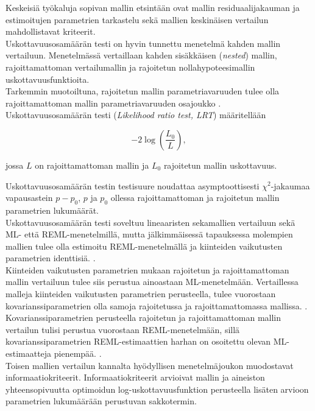 \documentclass[finnish]{docopts}
\begin{document}
Keskeisiä työkaluja sopivan mallin etsintään ovat mallin residuaalijakauman ja estimoitujen parametrien tarkastelu sekä mallien keskinäisen vertailun mahdollistavat kriteerit.\\

Uskottavuusosamäärän testi on hyvin tunnettu menetelmä kahden mallin vertailuun. Menetelmässä vertaillaan kahden sisäkkäisen (\textit{nested}) mallin, rajoittamattoman vertailumallin ja rajoitetun nollahypoteesimallin uskottavuusfunktioita.\\

Tarkemmin muotoiltuna, rajoitetun mallin parametriavaruuden tulee olla rajoittamattoman mallin parametriavaruuden osajoukko \citep{west14}.\\

Uskottavuusosamäärän testi (\textit{Likelihood ratio test, LRT}) määritellään

$$
-2 \log(\frac{L_0}{L}),
$$

jossa $L$ on rajoittamattoman mallin ja $L_0$ rajoitetun mallin uskottavuus.

Uskottavuusosamäärän testin testisuure noudattaa asymptoottisesti $\chi^2$-jakaumaa vapausastein $p-p_0$, $p$ ja $p_0$ ollessa rajoittamattoman ja rajoitetun mallin parametrien lukumäärät.\\

 Uskottavuusosamäärän testi soveltuu lineaaristen sekamallien vertailuun sekä ML- että REML-menetelmillä, mutta jälkimmäisessä tapauksessa molempien mallien tulee olla estimoitu REML-menetelmällä ja kiinteiden vaikutusten parametrien identtisiä. \citep{pinheiro00}.\\
 
 Kiinteiden vaikutusten parametrien mukaan rajoitetun ja rajoittamattoman mallin vertailuun tulee siis perustua ainoastaan ML-menetelmään. Vertaillessa malleja kiinteiden vaikutusten parametrien perusteella, tulee vuorostaan kovarianssiparametrien olla samoja rajoitetussa ja rajoittamattomassa mallissa. \citep{west14}.\\
 
 Kovarianssiparametrien perusteella rajoitetun ja rajoittamattoman mallin vertailun tulisi perustua vuorostaan REML-menetelmään, sillä kovarianssiparametrien REML-estimaattien harhan on osoitettu olevan ML-estimaatteja pienempää. \citep{west14}.\\
 
 Toisen mallien vertailun kannalta hyödyllisen menetelmäjoukon muodostavat informaatiokriteerit. Informaatiokriteerit arvioivat mallin ja aineiston yhteensopivuutta optimoidun log-uskottavuusfunktion perusteella lisäten arvioon parametrien lukumäärään perustuvan sakkotermin.\\
 
\end{document}
